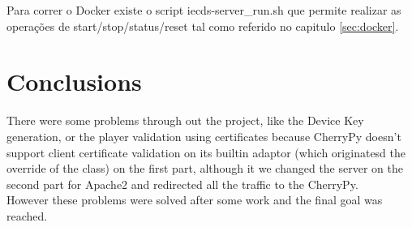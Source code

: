 \documentclass[11pt,a4paper]{report}
\begin{document}
Para correr o Docker existe o script iecds-server\_run.sh que permite realizar as operações de start/stop/status/reset tal como referido no capitulo \autoref{sec:docker}. 

\chapter{Conclusions}

There were some problems through out the project, like the Device Key generation, or the player validation using certificates because CherryPy doesn't support client certificate validation on its builtin adaptor (which originatesd the override of the class) on the first part, although it we changed the server on the second part for Apache2 and redirected all the traffic to the CherryPy.\\

However these problems were solved after some work and the final goal was reached. 





\listoffigures
{}
\end{document}
